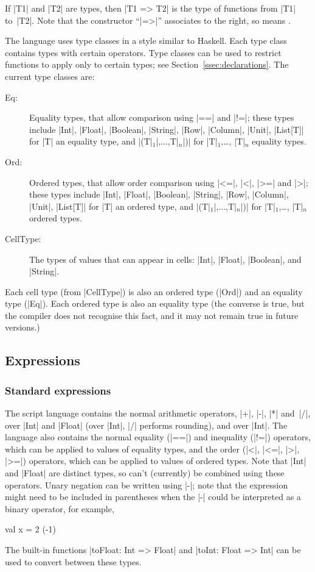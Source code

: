 If |T1| and |T2| are types, then |T1 => T2| is the type of functions from |T1|
to~|T2|.  Note that the constructor ``|=>|'' associates to the right, so
 means .

The language uses type classes in a style similar to Haskell.  Each type class
contains types with certain operators.  Type classes can be used to restrict
functions to apply only to certain types; see
Section~\ref{ssec:declarations}.  The current type classes are:
%
\begin{description}
\item[{\scalashape Eq}:] Equality types, that allow comparison using |==| and
  |!=|; these types include |Int|, |Float|, |Boolean|, |String|, |Row|,
  |Column|, |Unit|, |List[T]| for |T| an equality type, and
  |(T|$_1$|,...,T|$_n$|)| for |T|$_1$,\ldots, |T|$_n$ equality types.

\item[{\scalashape Ord}:] Ordered types, that allow order comparison using
  |<=|, |<|, |>=| and |>|; these types include |Int|, |Float|, |Boolean|,
  |String|, |Row|, |Column|, |Unit|, |List[T]| for |T| an ordered type, and
  |(T|$_1$|,...,T|$_n$|)| for |T|$_1$,\ldots, |T|$_n$ ordered types.

\item[{\scalashape CellType}:] The types of values that can appear in cells:
  |Int|, |Float|, |Boolean|, and |String|.
\end{description}
%
Each cell type (from |CellType|) is also an ordered type (|Ord|) and an
equality type (|Eq|).  Each ordered type is also an equality type (the
converse is true, but the compiler does not recognise this fact, and it may
not remain true in future versions.)



\subsection{Expressions}
\label{ssec:expressions}

\subsubsection{Standard expressions}

The script language contains the normal arithmetic operators, |+|, |-|, |*|
and~|/|, over |Int| and |Float| (over |Int|, |/| performs rounding), and
\SCALA{\%} over |Int|.  The language also contains the normal equality (|==|)
and inequality (|!=|) operators, which can be applied to values of equality
types, and the order (|<|, |<=|, |>|, |>=|) operators, which can be applied to
values of ordered types.  Note that |Int| and |Float| are distinct types, so
can't (currently) be combined using these operators.  Unary negation can be
written using |-|; note that the expression might need to be included in
parentheses when the |-| could be interpreted as a binary operator, for
example,
\begin{scala}
  { val x = 2
    (-1)
  }
\end{scala}
%
The built-in functions |toFloat: Int => Float| and
|toInt: Float => Int| can be used to convert between these types.

